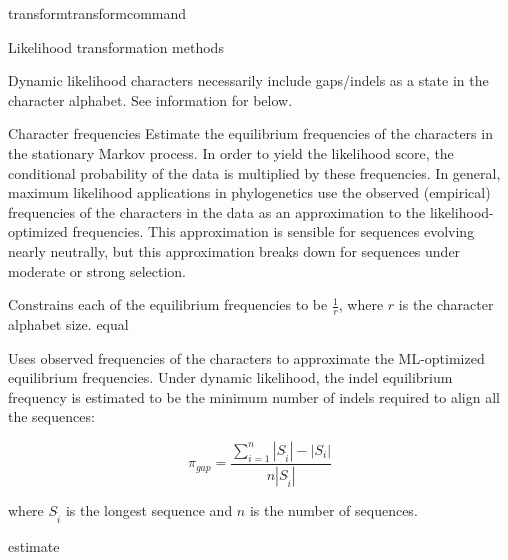 \begin{command}{transform}{transformcommand}
\begin{arguments}
\begin{argumentgroup}{Likelihood transformation methods}
            \begin{statement}
                Dynamic likelihood characters necessarily include gaps/indels as
                a state in the character alphabet. See information for
                 below.
            \end{statement}

	\end{argumentgroup}

	\begin{argumentgroup} {Character frequencies} %
		Estimate the equilibrium frequencies of the characters in the stationary
                    Markov process. In order to yield the likelihood score, the 
                    conditional probability of the data is multiplied by these frequencies. 
                    In general, maximum likelihood applications in phylogenetics use  the observed (empirical)
                    frequencies of the characters in the data  as an
                    approximation to the likelihood-optimized frequencies. This
                    approximation is sensible for sequences evolving nearly
                    neutrally, but this approximation breaks down for sequences
                    under moderate or strong selection.

                            {Constrains each of the equilibrium frequencies to be
                            $\frac{1}{r}$, where $r$ is the character alphabet size.}
                            {equal}

                            {Uses observed frequencies of the characters to
                            approximate the ML-optimized equilibrium
                            frequencies.  Under dynamic likelihood, the indel
                            equilibrium frequency is estimated to be the minimum
                            number of indels required to align all the
                            sequences: 
                            
                         \begin{equation*}
                            \pi_{gap} = \frac{\sum_{i=1}^n
                            |S_{\hat{i}}| - |S_i|}{n |S_{\hat{i}}|}
                            \end{equation*}
                            
                             where
                            $S_{\hat{i}}$ is the longest sequence and $n$ is the number of sequences.}
                            {estimate}


\end{argumentgroup}
\end{arguments}
\end{command}
